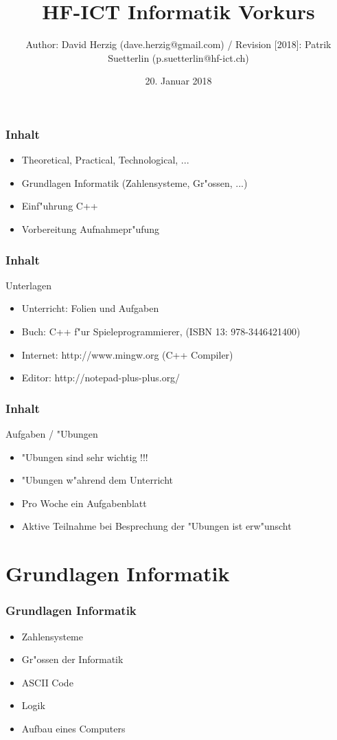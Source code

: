 \documentclass{beamer}
\title{HF-ICT Informatik Vorkurs}
\author{Author: David Herzig (dave.herzig@gmail.com) / Revision [2018]: Patrik Suetterlin (p.suetterlin@hf-ict.ch)}
\date{20. Januar 2018}
\begin{document}
\frame{\titlepage}

\setcounter{tocdepth}{1}

\frame
{
	\frametitle{Inhalt}
	\begin{itemize}
	\item Theoretical, Practical, Technological, ...
	\item Grundlagen Informatik (Zahlensysteme, Gr"ossen, ...)
	\item Einf"uhrung C++
	\item Vorbereitung Aufnahmepr"ufung
	\end{itemize}
}

\frame
{
	\frametitle{Inhalt}
	Unterlagen
	\begin{itemize}
	\item Unterricht: Folien und Aufgaben
	\item Buch: C++ f"ur Spieleprogrammierer, (ISBN 13: 978-3446421400)
	\item Internet: http://www.mingw.org (C++ Compiler)
	\item Editor: http://notepad-plus-plus.org/
	\end{itemize}
}

\frame
{
	\frametitle{Inhalt}
	Aufgaben / "Ubungen
	\begin{itemize}
	\item "Ubungen sind sehr wichtig !!!
	\item "Ubungen w"ahrend dem Unterricht
	\item Pro Woche ein Aufgabenblatt
	\item Aktive Teilnahme bei Besprechung der "Ubungen ist erw"unscht
	\end{itemize}
}

\section{Grundlagen Informatik}
\frame
{
	\frametitle{Grundlagen Informatik}
	\begin{itemize}
	\item Zahlensysteme
	\item Gr"ossen der Informatik
	\item ASCII Code
	\item Logik
	\item Aufbau eines Computers
	\end{itemize}
}
\end{document}
